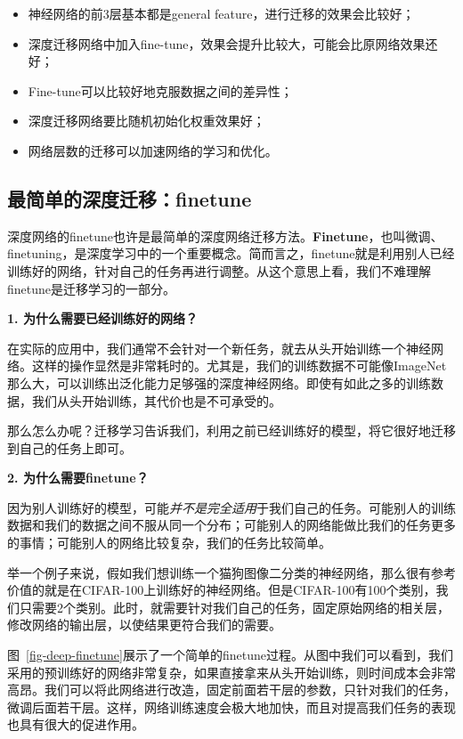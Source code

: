 \begin{itemize}
	\item 神经网络的前3层基本都是general feature，进行迁移的效果会比较好；
	\item 深度迁移网络中加入fine-tune，效果会提升比较大，可能会比原网络效果还好；
	\item Fine-tune可以比较好地克服数据之间的差异性；
	\item 深度迁移网络要比随机初始化权重效果好；
	\item 网络层数的迁移可以加速网络的学习和优化。
\end{itemize}

\subsection{最简单的深度迁移：finetune}

深度网络的finetune也许是最简单的深度网络迁移方法。\textbf{Finetune}，也叫微调、finetuning，是深度学习中的一个重要概念。简而言之，finetune就是利用别人已经训练好的网络，针对自己的任务再进行调整。从这个意思上看，我们不难理解finetune是迁移学习的一部分。

\textbf{1. 为什么需要已经训练好的网络？}

在实际的应用中，我们通常不会针对一个新任务，就去从头开始训练一个神经网络。这样的操作显然是非常耗时的。尤其是，我们的训练数据不可能像ImageNet那么大，可以训练出泛化能力足够强的深度神经网络。即使有如此之多的训练数据，我们从头开始训练，其代价也是不可承受的。

那么怎么办呢？迁移学习告诉我们，利用之前已经训练好的模型，将它很好地迁移到自己的任务上即可。

\textbf{2. 为什么需要finetune？}

因为别人训练好的模型，可能\textit{并不是完全适用}于我们自己的任务。可能别人的训练数据和我们的数据之间不服从同一个分布；可能别人的网络能做比我们的任务更多的事情；可能别人的网络比较复杂，我们的任务比较简单。

举一个例子来说，假如我们想训练一个猫狗图像二分类的神经网络，那么很有参考价值的就是在CIFAR-100上训练好的神经网络。但是CIFAR-100有100个类别，我们只需要2个类别。此时，就需要针对我们自己的任务，固定原始网络的相关层，修改网络的输出层，以使结果更符合我们的需要。

图~\ref{fig-deep-finetune}展示了一个简单的finetune过程。从图中我们可以看到，我们采用的预训练好的网络非常复杂，如果直接拿来从头开始训练，则时间成本会非常高昂。我们可以将此网络进行改造，固定前面若干层的参数，只针对我们的任务，微调后面若干层。这样，网络训练速度会极大地加快，而且对提高我们任务的表现也具有很大的促进作用。

